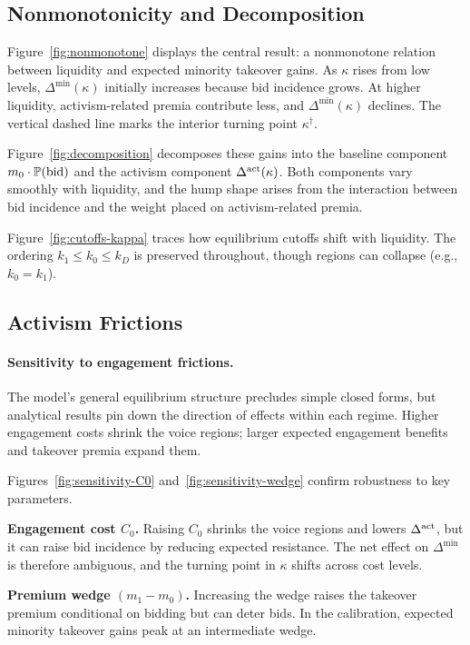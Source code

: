 \documentclass[11pt]{article}
\newcommand{\PP}{\mathbb{P}}
\newcommand{\1}{\mathbf{1}}
\begin{document}
%
\subsection{Nonmonotonicity and Decomposition}
%

Figure~\ref{fig:nonmonotone} displays the central result: a nonmonotone relation between liquidity and expected minority takeover gains. As $\kappa$ rises from low levels, $\Delta^{\min}(\kappa)$ initially increases because bid incidence grows. At higher liquidity, activism-related premia contribute less, and $\Delta^{\min}(\kappa)$ declines. The vertical dashed line marks the interior turning point $\kappa^{\dagger}$.

Figure~\ref{fig:decomposition} decomposes these gains into the baseline component $m_0 \cdot \PP(\textup{bid})$ and the activism component $\Delta^{\textup{act}}(\kappa)$. Both components vary smoothly with liquidity, and the hump shape arises from the interaction between bid incidence and the weight placed on activism-related premia.

Figure~\ref{fig:cutoffs-kappa} traces how equilibrium cutoffs shift with liquidity. The ordering $k_1 \le k_0 \le k_D$ is preserved throughout, though regions can collapse (e.g., $k_0=k_1$).

%
\subsection{Activism Frictions}
%

\paragraph{Sensitivity to engagement frictions.}
The model's general equilibrium structure precludes simple closed forms, but analytical results pin down the direction of effects within each regime. Higher engagement costs shrink the voice regions; larger expected engagement benefits and takeover premia expand them.

Figures~\ref{fig:sensitivity-C0} and~\ref{fig:sensitivity-wedge} confirm robustness to key parameters.

\textbf{Engagement cost $C_0$.} Raising $C_0$ shrinks the voice regions and lowers $\Delta^{\textup{act}}$, but it can raise bid incidence by reducing expected resistance. The net effect on $\Delta^{\min}$ is therefore ambiguous, and the turning point in $\kappa$ shifts across cost levels.

\textbf{Premium wedge $(m_1 - m_0)$.} Increasing the wedge raises the takeover premium conditional on bidding but can deter bids. In the calibration, expected minority takeover gains peak at an intermediate wedge.
\end{document}
